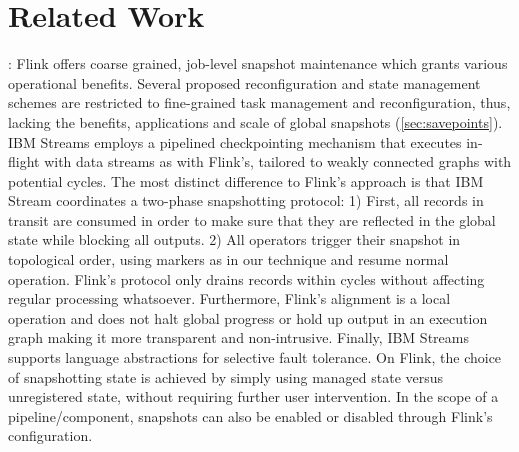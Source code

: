 
\section{Related Work}
\label{sec:related}
: Flink offers coarse grained, job-level snapshot maintenance which grants various operational benefits. Several proposed reconfiguration and state management schemes \cite{castro2013integrating} are restricted to fine-grained task management and reconfiguration, thus, lacking the benefits, applications and scale of global snapshots (\autoref{sec:savepoints}). IBM Streams employs a pipelined checkpointing mechanism \cite{jacques2016consistent} that executes in-flight with data streams as with Flink's, tailored to weakly connected graphs with potential cycles. The most distinct difference to Flink's approach is that IBM Stream coordinates a two-phase snapshotting protocol: 1) First, all records in transit are consumed in order to make sure that they are reflected in the global state while blocking all outputs. 2) All operators trigger their snapshot in topological order, using markers as in our technique and resume normal operation. Flink's protocol only drains records within cycles without affecting regular processing whatsoever. Furthermore, Flink's alignment is a local operation and does not halt global progress or hold up output in an execution graph making it more transparent and non-intrusive. Finally, IBM Streams supports language abstractions for selective fault tolerance. On Flink, the choice of snapshotting state is achieved by simply using managed state versus unregistered state, without requiring further user intervention. In the scope of a pipeline/component, snapshots can also be enabled or disabled through Flink's configuration. 

